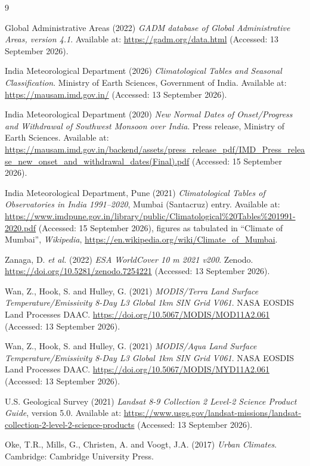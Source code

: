 \documentclass[11pt,a4paper]{article}
\begin{document}
\begin{thebibliography}{9}

Global Administrative Areas (2022) \textit{GADM database of Global
Administrative Areas, version 4.1}. Available at:
\url{https://gadm.org/data.html} (Accessed: 13 September 2026).

India Meteorological Department (2026) \textit{Climatological Tables
and Seasonal Classification}. Ministry of Earth Sciences, Government
of India. Available at: \url{https://mausam.imd.gov.in/}
(Accessed: 13 September 2026).

India Meteorological Department (2020) \textit{New Normal Dates of
Onset/Progress and Withdrawal of Southwest Monsoon over India}. Press
release, Ministry of Earth Sciences. Available at:
\url{https://mausam.imd.gov.in/backend/assets/press_release_pdf/IMD_Press_release_new_onset_and_withdrawal_dates(Final).pdf}
(Accessed: 15 September 2026).

India Meteorological Department, Pune (2021) \textit{Climatological
Tables of Observatories in India 1991--2020}, Mumbai (Santacruz)
entry. Available at:
\url{https://www.imdpune.gov.in/library/public/Climatological\%20Tables\%201991-2020.pdf}
(Accessed: 15 September 2026), figures as tabulated in
``Climate of Mumbai'', \textit{Wikipedia},
\url{https://en.wikipedia.org/wiki/Climate_of_Mumbai}.

Zanaga, D. \textit{et al.} (2022) \textit{ESA WorldCover 10 m 2021
v200}. Zenodo. \url{https://doi.org/10.5281/zenodo.7254221}
(Accessed: 13 September 2026).

Wan, Z., Hook, S. and Hulley, G. (2021) \textit{MODIS/Terra Land
Surface Temperature/Emissivity 8-Day L3 Global 1km SIN Grid V061}.
NASA EOSDIS Land Processes DAAC.
\url{https://doi.org/10.5067/MODIS/MOD11A2.061}
(Accessed: 13 September 2026).

Wan, Z., Hook, S. and Hulley, G. (2021) \textit{MODIS/Aqua Land
Surface Temperature/Emissivity 8-Day L3 Global 1km SIN Grid V061}.
NASA EOSDIS Land Processes DAAC.
\url{https://doi.org/10.5067/MODIS/MYD11A2.061}
(Accessed: 13 September 2026).

U.S. Geological Survey (2021) \textit{Landsat 8-9 Collection 2
Level-2 Science Product Guide}, version 5.0. Available at:
\url{https://www.usgs.gov/landsat-missions/landsat-collection-2-level-2-science-products}
(Accessed: 13 September 2026).

Oke, T.R., Mills, G., Christen, A. and Voogt, J.A. (2017)
\textit{Urban Climates}. Cambridge: Cambridge University Press.

\end{thebibliography}
\end{document}
